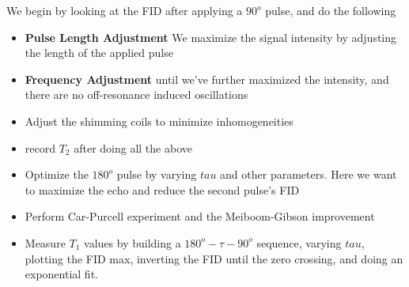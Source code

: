 \documentclass[12pt]{article}
\begin{document}
We begin by looking at the FID after applying a $90^o$ pulse, and do the following

\begin{itemize}
    \item \textbf{Pulse Length Adjustment} We maximize the signal intensity by adjusting the length of the applied pulse
    \item \textbf{Frequency Adjustment} until we've further maximized the intensity, and there are no off-resonance induced oscillations
    \item Adjust the shimming coils to minimize inhomogeneities
    \item record $T_2$ after doing all the above
    \item Optimize the $180^o$ pulse by varying $tau$ and other parameters. Here we want to maximize the echo and reduce the second pulse's FID
    \item Perform Car-Purcell experiment and the Meiboom-Gibson improvement
    \item Measure $T_1$ values by building a $180^o - \tau - 90^o$ sequence, varying $tau$, plotting the FID max, inverting the FID until the zero crossing, and doing an exponential fit.


\end{itemize}



\end{document}

